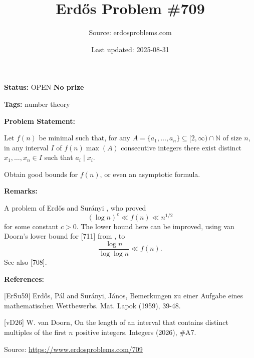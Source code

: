 \documentclass{article}
\title{Erd\H{o}s Problem \#709}
\date{Last updated: 2025-08-31}
\author{Source: erdosproblems.com}
\begin{document}
\maketitle

\noindent\textbf{Status:} OPEN \quad \textbf{No prize}

\noindent\textbf{Tags:} number theory

\medskip
\noindent\textbf{Problem Statement:}

Let $f(n)$ be minimal such that, for any $A=\{a_1,\ldots,a_n\}\subseteq [2,\infty)\cap\mathbb{N}$ of size $n$, in any interval $I$ of $f(n)\max(A)$ consecutive integers there exist distinct $x_1,\ldots,x_n\in I$ such that $a_i\mid x_i$.

Obtain good bounds for $f(n)$, or even an asymptotic formula.

\bigskip
\noindent\textbf{Remarks:}

A problem of Erd\H{o}s and Sur\'{a}nyi \cite{ErSu59}, who proved\[(\log n)^c \ll f(n) \ll n^{1/2}\]for some constant $c>0$. The lower bound here can be improved, using van Doorn's lower bound for [711] from \cite{vD26}, to\[\frac{\log n}{\log\log n}\ll f(n).\]See also [708].

\bigskip
\noindent\textbf{References:}

[ErSu59] Erd\H{o}s, P\'{a}l and Sur\'{a}nyi, J\'{a}nos, Bemerkungen zu einer Aufgabe eines mathematischen
{W}ettbewerbs. Mat. Lapok (1959), 39-48.
 
 [vD26] W. van Doorn, On the length of an interval that contains distinct multiples of the first $n$ positive integers. Integers (2026), #A7.

\bigskip
\noindent\small{Source: \url{https://www.erdosproblems.com/709}}
\end{document}
